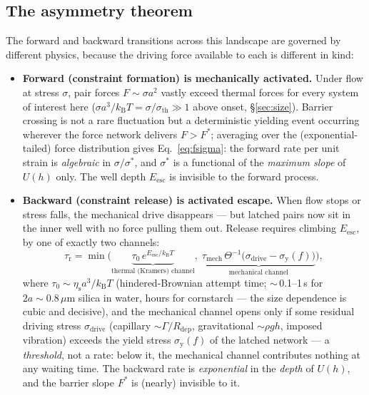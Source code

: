\documentclass[11pt]{article}
\newcommand{\sigmastar}{\sigma^{*}}
\newcommand{\etas}{\eta_{\mathrm{s}}}
\newcommand{\Fstar}{F^{*}}
\begin{document}
\subsection{The asymmetry theorem}
\label{sec:asymmetry}
The forward and backward transitions across this landscape are governed by different physics, because the driving force available to each is different in kind:

\begin{itemize}
\item \textbf{Forward (constraint formation) is mechanically activated.} Under flow at stress $\sigma$, pair forces $F \sim \sigma a^{2}$ vastly exceed thermal forces for every system of interest here ($\sigma a^{3}/k_{\mathrm{B}}T = \sigma/\sigma_{\mathrm{th}} \gg 1$ above onset, \S\ref{sec:size}). Barrier crossing is not a rare fluctuation but a deterministic yielding event occurring wherever the force network delivers $F > \Fstar$; averaging over the (exponential-tailed) force distribution gives Eq.~\eqref{eq:fsigma}: the forward rate per unit strain is \emph{algebraic} in $\sigma/\sigmastar$, and $\sigmastar$ is a functional of the \emph{maximum slope} of $U(h)$ only. The well depth $E_{\mathrm{esc}}$ is invisible to the forward process.
\item \textbf{Backward (constraint release) is activated escape.} When flow stops or stress falls, the mechanical drive disappears --- but latched pairs now sit in the inner well with no force pulling them out. Release requires climbing $E_{\mathrm{esc}}$, by one of exactly two channels:
\begin{equation}
\tau_{\mathrm{r}} = \min\Big(
\underbrace{\tau_{0}\, e^{E_{\mathrm{esc}}/k_{\mathrm{B}}T}}_{\text{thermal (Kramers) channel}},\;
\underbrace{\tau_{\mathrm{mech}}\,\Theta^{-1}\!\big(\sigma_{\mathrm{drive}} - \sigma_{\mathrm{y}}(f)\big)}_{\text{mechanical channel}}
\Big),
\label{eq:taur}
\end{equation}
where $\tau_{0} \sim \etas a^{3}/k_{\mathrm{B}}T$ (hindered-Brownian attempt time; $\sim$\,0.1--1\,s for $2a \sim 0.8\,\mu$m silica in water, hours for cornstarch --- the size dependence is cubic and decisive), and the mechanical channel opens only if some residual driving stress $\sigma_{\mathrm{drive}}$ (capillary $\sim\Gamma/R_{\mathrm{dep}}$, gravitational $\sim\rho g h$, imposed vibration) exceeds the yield stress $\sigma_{\mathrm{y}}(f)$ of the latched network --- a \emph{threshold}, not a rate: below it, the mechanical channel contributes nothing at any waiting time. The backward rate is \emph{exponential} in the \emph{depth} of $U(h)$, and the barrier slope $\Fstar$ is (nearly) invisible to it.
\end{itemize}
\end{document}
